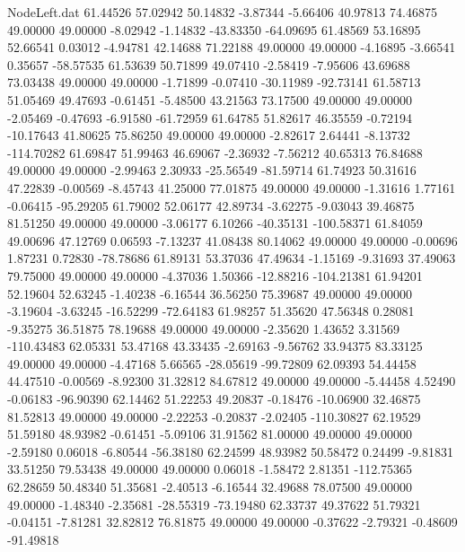 \begin{filecontents}{NodeLeft.dat}
  61.44526   57.02942   50.14832    -3.87344   -5.66406   40.97813   74.46875   49.00000   49.00000   -8.02942   -1.14832  -43.83350  -64.09695
  61.48569   53.16895   52.66541     0.03012   -4.94781   42.14688   71.22188   49.00000   49.00000   -4.16895   -3.66541    0.35657  -58.57535
  61.53639   50.71899   49.07410    -2.58419   -7.95606   43.69688   73.03438   49.00000   49.00000   -1.71899   -0.07410  -30.11989  -92.73141
  61.58713   51.05469   49.47693    -0.61451   -5.48500   43.21563   73.17500   49.00000   49.00000   -2.05469   -0.47693   -6.91580  -61.72959
  61.64785   51.82617   46.35559    -0.72194  -10.17643   41.80625   75.86250   49.00000   49.00000   -2.82617    2.64441   -8.13732 -114.70282
  61.69847   51.99463   46.69067    -2.36932   -7.56212   40.65313   76.84688   49.00000   49.00000   -2.99463    2.30933  -25.56549  -81.59714
  61.74923   50.31616   47.22839    -0.00569   -8.45743   41.25000   77.01875   49.00000   49.00000   -1.31616    1.77161   -0.06415  -95.29205
  61.79002   52.06177   42.89734    -3.62275   -9.03043   39.46875   81.51250   49.00000   49.00000   -3.06177    6.10266  -40.35131 -100.58371
  61.84059   49.00696   47.12769     0.06593   -7.13237   41.08438   80.14062   49.00000   49.00000   -0.00696    1.87231    0.72830  -78.78686
  61.89131   53.37036   47.49634    -1.15169   -9.31693   37.49063   79.75000   49.00000   49.00000   -4.37036    1.50366  -12.88216 -104.21381
  61.94201   52.19604   52.63245    -1.40238   -6.16544   36.56250   75.39687   49.00000   49.00000   -3.19604   -3.63245  -16.52299  -72.64183
  61.98257   51.35620   47.56348     0.28081   -9.35275   36.51875   78.19688   49.00000   49.00000   -2.35620    1.43652    3.31569 -110.43483
  62.05331   53.47168   43.33435    -2.69163   -9.56762   33.94375   83.33125   49.00000   49.00000   -4.47168    5.66565  -28.05619  -99.72809
  62.09393   54.44458   44.47510    -0.00569   -8.92300   31.32812   84.67812   49.00000   49.00000   -5.44458    4.52490   -0.06183  -96.90390
  62.14462   51.22253   49.20837    -0.18476  -10.06900   32.46875   81.52813   49.00000   49.00000   -2.22253   -0.20837   -2.02405 -110.30827
  62.19529   51.59180   48.93982    -0.61451   -5.09106   31.91562   81.00000   49.00000   49.00000   -2.59180    0.06018   -6.80544  -56.38180
  62.24599   48.93982   50.58472     0.24499   -9.81831   33.51250   79.53438   49.00000   49.00000    0.06018   -1.58472    2.81351 -112.75365
  62.28659   50.48340   51.35681    -2.40513   -6.16544   32.49688   78.07500   49.00000   49.00000   -1.48340   -2.35681  -28.55319  -73.19480
  62.33737   49.37622   51.79321    -0.04151   -7.81281   32.82812   76.81875   49.00000   49.00000   -0.37622   -2.79321   -0.48609  -91.49818

\end{filecontents}
